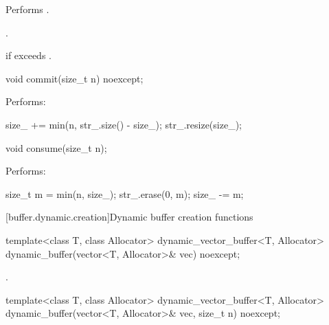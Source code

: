 \begin{itemdescr}
\pnum
\effects Performs .

\pnum
\returns {}.

\pnum
\remarks {} if  exceeds .
\end{itemdescr}

%
\begin{itemdecl}
void commit(size_t n) noexcept;
\end{itemdecl}

\begin{itemdescr}
\pnum
\effects Performs:
\begin{codeblock}
size_ += min(n, str_.size() - size_);
str_.resize(size_);
\end{codeblock}

\end{itemdescr}

%
\begin{itemdecl}
void consume(size_t n);
\end{itemdecl}

\begin{itemdescr}
\pnum
\effects Performs:
\begin{codeblock}
size_t m = min(n, size_);
str_.erase(0, m);
size_ -= m;
\end{codeblock}

\end{itemdescr}



[buffer.dynamic.creation]{Dynamic buffer creation functions}

%
\begin{itemdecl}
template<class T, class Allocator>
  dynamic_vector_buffer<T, Allocator>
  dynamic_buffer(vector<T, Allocator>& vec) noexcept;
\end{itemdecl}

\begin{itemdescr}
\pnum
\returns {}.
\end{itemdescr}

\begin{itemdecl}
template<class T, class Allocator>
  dynamic_vector_buffer<T, Allocator>
  dynamic_buffer(vector<T, Allocator>& vec, size_t n) noexcept;
\end{itemdecl}

